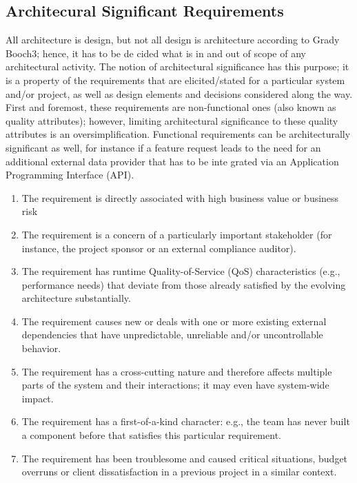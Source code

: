 \documentclass[../Main.tex]{subfiles}
\begin{document}
\subsection{Architecural Significant Requirements}
All architecture is design, but not all design is architecture according to Grady Booch3; hence, it has to be de cided what is in and out of scope of any architectural activity. The notion of architectural significance has this purpose; it is a property of the requirements that are elicited/stated for a particular system and/or project, as well as design elements and decisions considered along the way. First and foremost, these requirements are non‑functional ones (also known as quality attributes); however, limiting architectural significance to these quality attributes is an oversimplification. Functional requirements can be architecturally significant as well, for instance if a feature request leads to the need for an additional external data provider that has to be inte grated via an Application Programming Interface (API).
\begin{enumerate}
    \item The requirement is directly associated with high business value or business risk
    \item The requirement is a concern of a particularly important stakeholder (for instance, the project sponsor or an external compliance auditor). 
    \item The requirement has runtime Quality-of-Service (QoS) characteristics (e.g., performance needs) that deviate from those already satisfied by the evolving architecture substantially.
    \item The requirement causes new or deals with one or more existing external dependencies that have unpredictable, unreliable and/or uncontrollable behavior. 
    \item The requirement has a cross-cutting nature and therefore affects multiple parts of the system and their interactions; it may even have system-wide impact. 
    \item The requirement has a first-of-a-kind character: e.g., the team has never built a component before that satisfies this particular requirement. 
    \item The requirement has been troublesome and caused critical situations, budget overruns or client dissatisfaction in a previous project in a similar context. 
\end{enumerate}
\end{document}
